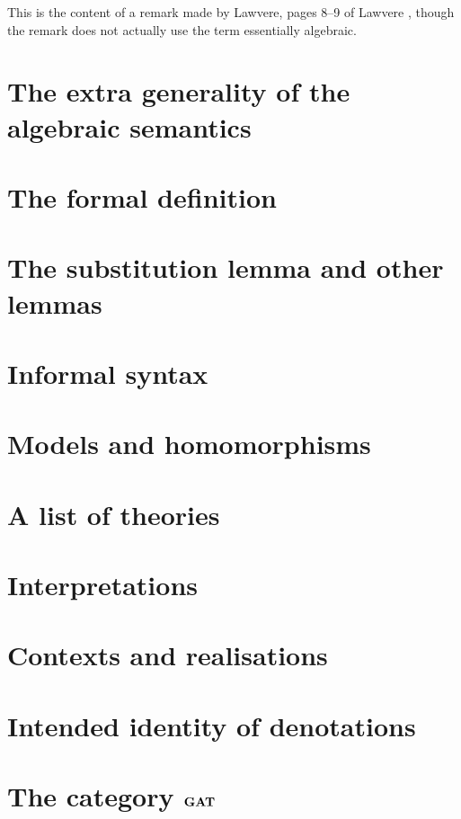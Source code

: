 This is the content of a remark made by Lawvere, pages 8--9 of Lawvere \cite{lawvere:17}, though the remark does not actually use the term essentially algebraic.

\section{The extra generality of the algebraic semantics} \label{sec:source-1-5}

\lipsum[4]

\section{The formal definition} \label{sec:source-1-6}

\lipsum[5]

\section{The substitution lemma and other lemmas} \label{sec:source-1-7}

\lipsum[6]

\section{Informal syntax} \label{sec:source-1-8}

\lipsum[7]

\section{Models and homomorphisms} \label{sec:source-1-9}

\lipsum[8]

\section{A list of theories} \label{sec:source-1-10}

\lipsum[9]

\section{Interpretations} \label{sec:source-1-11}

\lipsum[10]

\section{Contexts and realisations} \label{sec:source-1-12}

\lipsum[11]

\section{Intended identity of denotations} \label{sec:source-1-13}

\lipsum[12]

\section{The category $\mathbf{GAT}$} \label{sec:source-1-14}

\lipsum[13]


